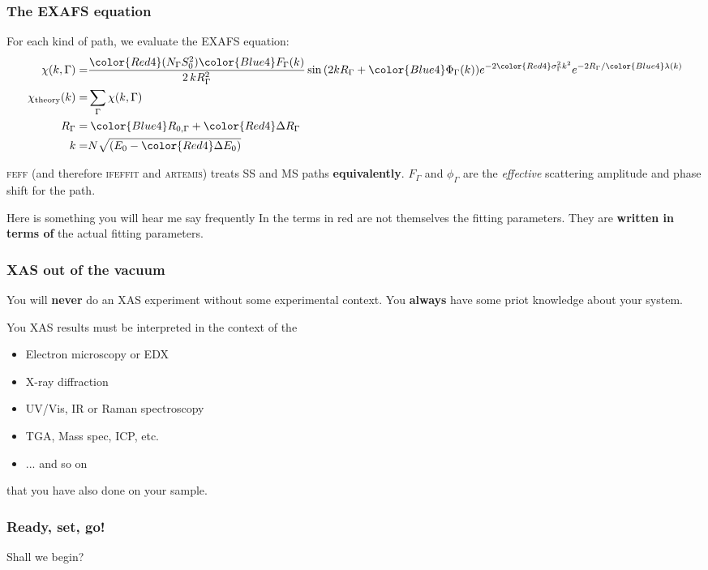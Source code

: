 \documentclass[10pt, xcolor=x11names, compress]{beamer}
\begin{document}
\begin{frame}
  \frametitle{The EXAFS equation}

  For each kind of path, we evaluate the EXAFS equation:
  {\small
    \begin{align}
      \chi(k,\Gamma) =& 
      { \frac{{\color{Red4}(N_\Gamma S_0^2)}{\color{Blue4}F_\Gamma(k)}}
        {2\,kR_\Gamma^2} }
      \sin{(2kR_\Gamma + {\color{Blue4}\Phi_\Gamma(k)})}
      e^{-2{\color{Red4}\sigma_\Gamma^2}k^2}
      e^{-2R_\Gamma/{\color{Blue4}\lambda(k)}} \\
      \chi_{\mathrm{theory}}(k) =& \sum\limits_{\Gamma}\chi(k,\Gamma)\\
      R_\Gamma =& \> {\color{Blue4}R_{0,\Gamma}} +
      {\color{Red4}\Delta R_\Gamma} \\
      k =& N\sqrt{(E_0 - {\color{Red4}\Delta E_0})}
    \end{align}}

  \medskip

  \textsc{feff} (and therefore \textsc{ifeffit} and \textsc{artemis})
  treats SS and MS paths \textbf{equivalently}. $F_\Gamma$ and $\phi_\Gamma$
  are the \textit{effective} scattering amplitude and phase shift for
  the path.

  \begin{alertblock}{Here is something you will hear me say frequently}
    In {\ifeffit} the {\color{Red4}terms in red} are not
    themselves the fitting parameters.  They are \textbf{written in
      terms of} the actual fitting parameters.
  \end{alertblock}
\end{frame}

\begin{frame}
  \frametitle{XAS out of the vacuum}
  \begin{alertblock}{}
    You will \textbf{never} do an XAS experiment without some
    experimental context.  You \textbf{always} have some priot
    knowledge about your system.
  \end{alertblock}
  You XAS results must be interpreted in the context of the
  \begin{itemize}
  \item Electron microscopy or EDX
  \item X-ray diffraction
  \item UV/Vis, IR or Raman spectroscopy
  \item TGA, Mass spec, ICP, etc.
  \item ... and so on
  \end{itemize}
  that you have also done on your sample.
\end{frame}

\begin{frame}
  \frametitle{Ready, set, go!}
  \begin{alertblock}{}
    \begin{center}
      \LARGE \alert{Shall we begin?}
    \end{center}

  \end{alertblock}
\end{frame}
\end{document}
